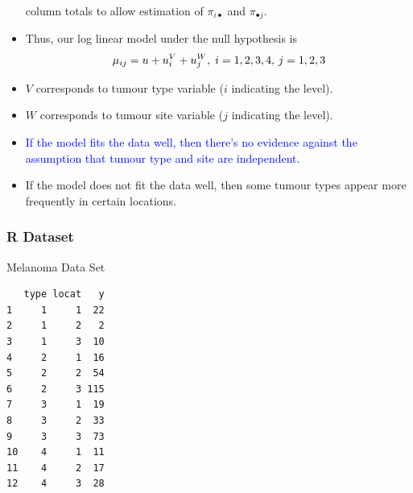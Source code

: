 \documentclass[oneside]{book}\usepackage[]{graphicx}\usepackage[svgnames]{xcolor}
\makeatletter
\newenvironment{kframe}{%
 \def\at@end@of@kframe{}%
 \ifinner\ifhmode%
  \def\at@end@of@kframe{\end{minipage}}%
  \begin{minipage}{\columnwidth}%
 \fi\fi%
 \def\FrameCommand##1{\hskip\@totalleftmargin \hskip-\fboxsep
 \colorbox{shadecolor}{##1}\hskip-\fboxsep
     \hskip-\linewidth \hskip-\@totalleftmargin \hskip\columnwidth}%
 \MakeFramed {\advance\hsize-\width
   \@totalleftmargin\z@ \linewidth\hsize
   \@setminipage}}%
 {\par\unskip\endMakeFramed%
 \at@end@of@kframe}
\newenvironment{knitrout}{}{} %
\let\log\relax%
\makeatother
\begin{document}
\begin{itemize}
          column totals to allow estimation of $ \pi_{i\bullet} $ and $ \pi_{\bullet j} $.
    \item Thus, our log linear model under the null hypothesis is
          \[ \log{\mu_{ij}}=u+u_i^V+u_j^W,\; i=1,2,3,4,\,j=1,2,3 \]
    \item $V$ corresponds to tumour type variable ($i$ indicating the level).
    \item $W$ corresponds to tumour site variable ($j$ indicating the level).
    \item \textcolor{Blue}{If the model fits the data well, then there's no evidence against the assumption
              that tumour type and site are independent}.
    \item If the model does not fit the data well, then some tumour types appear more
          frequently in certain locations.
\end{itemize}
\subsubsection*{R Dataset}
\begin{Example}{Melanoma Data Set}
\begin{knitrout}
\color{fgcolor}\begin{kframe}
\begin{verbatim}
   type locat   y
1     1     1  22
2     1     2   2
3     1     3  10
4     2     1  16
5     2     2  54
6     2     3 115
7     3     1  19
8     3     2  33
9     3     3  73
10    4     1  11
11    4     2  17
12    4     3  28
\end{verbatim}
\end{kframe}
\end{knitrout}
\end{Example}
\end{document}
